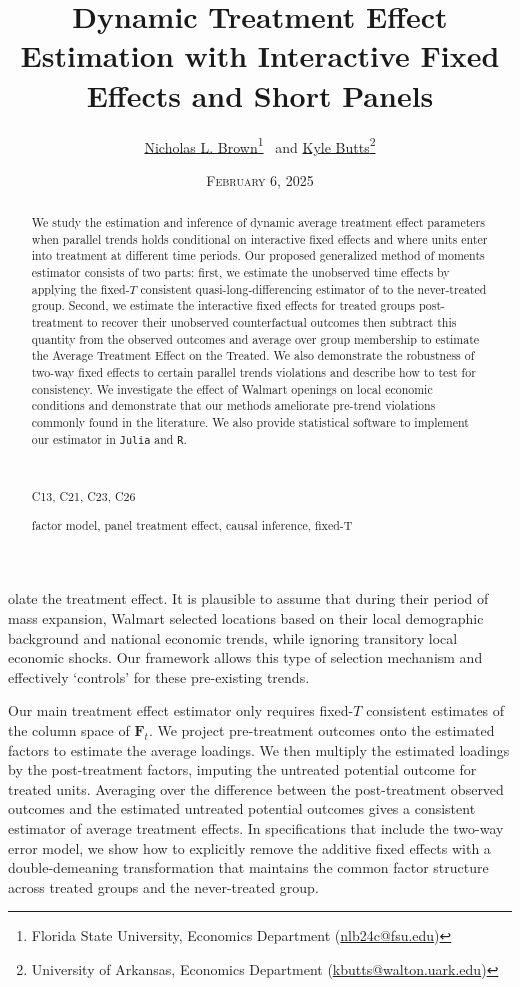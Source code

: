 \documentclass[12pt]{article}
\title{%
    Dynamic Treatment Effect Estimation with Interactive Fixed Effects and Short Panels
}
\author{%
  \href{https://sites.google.com/msu.edu/nicholasbrown}{Nicholas L. Brown}\thanks{Florida State University, Economics Department (\href{mailto:nlb24c@fsu.edu}{nlb24c@fsu.edu})}
  \ and 
  \href{https://kylebutts.com/}{Kyle Butts}\thanks{University of Arkansas, Economics Department (\href{mailto:kbutts@walton.uark.edu}{kbutts@walton.uark.edu})}
}
\date{\textsc{February 6, 2025}}
\begin{document}
\maketitle

\begin{abstract}
We study the estimation and inference of dynamic average treatment effect parameters when parallel trends holds conditional on interactive fixed effects and where units enter into treatment at different time periods. Our proposed generalized method of moments estimator consists of two parts: first, we estimate the unobserved time effects by applying the fixed-$T$ consistent quasi-long-differencing estimator of \citet{Ahn_Lee_Schmidt_2013} to the never-treated group. Second, we estimate the interactive fixed effects for treated groups post-treatment to recover their unobserved counterfactual outcomes then subtract this quantity from the observed outcomes and average over group membership to estimate the Average Treatment Effect on the Treated. We also demonstrate the robustness of two-way fixed effects to certain parallel trends violations and describe how to test for consistency. We investigate the effect of Walmart openings on local economic conditions and demonstrate that our methods ameliorate pre-trend violations commonly found in the literature. We also provide statistical software to implement our estimator in \texttt{Julia} and \texttt{R}.
  
  \par~\par\noindent
   C13, C21, C23, C26
  \par
   factor model, panel treatment effect, causal inference, fixed-T
  \par\vspace{-2.5mm}
\end{abstract}

\newpage
olate the treatment effect. It is plausible to assume that during their period of mass expansion, Walmart selected locations based on their local demographic background and national economic trends, while ignoring transitory local economic shocks. Our framework allows this type of selection mechanism and effectively `controls' for these pre-existing trends.

Our main treatment effect estimator only requires fixed-$T$ consistent estimates of the column space of $\bm{F}_t$. We project pre-treatment outcomes onto the estimated factors to estimate the average loadings. We then multiply the estimated loadings by the post-treatment factors, imputing the untreated potential outcome for treated units. Averaging over the difference between the post-treatment observed outcomes and the estimated untreated potential outcomes gives a consistent estimator of average treatment effects. In specifications that include the two-way error model, we show how to explicitly remove the additive fixed effects with a double-demeaning transformation that maintains the common factor structure across treated groups and the never-treated group.
\end{document}
